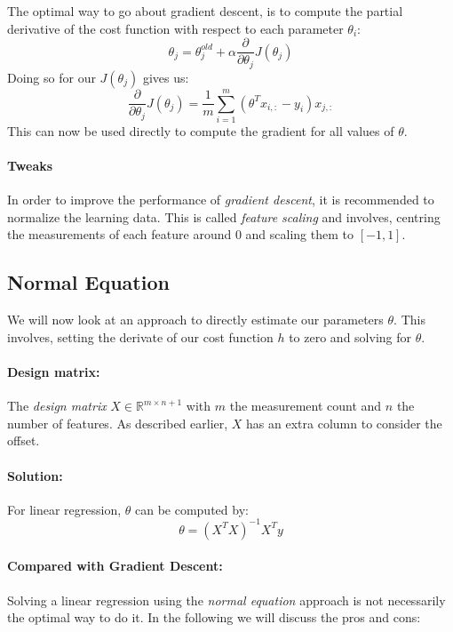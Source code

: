 \documentclass[11pt,a4paper]{article}
\begin{document}
The optimal way to go about gradient descent, is to compute the partial derivative of the cost function with respect to each parameter $\theta_i$:
\begin{equation}
\theta_j = \theta_{j}^{old} + \alpha\frac{\partial}{\partial \theta_j}J(\theta_j)
\end{equation}
Doing so for our $J(\theta_j)$ gives us:
\begin{equation}
\frac{\partial}{\partial \theta_j} J(\theta_j) = \frac{1}{m}\sum\limits_{i=1}^m(\theta^Tx_{i,:}-y_i)x_{j,:}
\end{equation}
This can now be used directly to compute the gradient for all values of $\theta$.

\paragraph{Tweaks}
In order to improve the performance of \emph{gradient descent}, it is recommended to normalize the learning data.
This is called \emph{feature scaling} and involves, centring the measurements of each feature around 0 and scaling them to $[-1,1]$.

\subsection{Normal Equation}
We will now look at an approach to directly estimate our parameters $\theta$.
This involves, setting the derivate of our cost function $h$ to zero and solving for $\theta$.

\paragraph{Design matrix:} The \emph{design matrix} $X \in \mathbb{R}^{m\times n+1}$ with $m$ the measurement count and $n$ the number of features.
As described earlier, $X$ has an extra column to consider the offset.

\paragraph{Solution:} For linear regression, $\theta$ can be computed by:
\begin{equation}
\theta = (X^TX)^{-1}X^Ty
\end{equation}

\paragraph{Compared with Gradient Descent:}
Solving a linear regression using the \emph{normal equation} approach is not necessarily the optimal way to do it.
In the following we will discuss the pros and cons:
\end{document}
